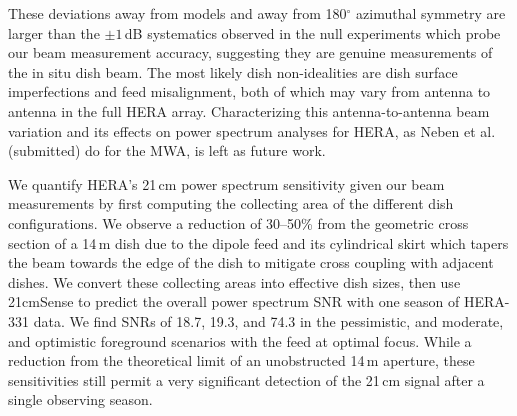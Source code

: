 \documentclass{emulateapj}
\begin{document}
These deviations away from models and away from 180$^\circ$ azimuthal symmetry are larger than the $\pm1$\,dB systematics observed in the null experiments which probe our beam measurement accuracy, suggesting they are genuine measurements of the in situ dish beam. The most likely dish non-idealities are dish surface imperfections and feed misalignment, both of which may vary from antenna to antenna in the full HERA array. Characterizing this antenna-to-antenna beam variation and its effects on power spectrum analyses for HERA, as Neben et al. (submitted) do for the MWA, is left as future work.

We quantify HERA's 21\,cm power spectrum sensitivity given our beam measurements by first computing the collecting area of the different dish configurations. We observe a reduction of 30--50\% from the geometric cross section of a 14\,m dish due to the dipole feed and its cylindrical skirt which tapers the beam towards the edge of the dish to mitigate cross coupling with adjacent dishes. We convert these collecting areas into effective dish sizes, then use 21cmSense to predict the overall power spectrum SNR with one season of HERA-331 data. We find SNRs of 18.7, 19.3, and 74.3 in the pessimistic, and moderate, and optimistic foreground scenarios with the feed at optimal focus. While a reduction from the theoretical limit of an unobstructed 14\,m aperture, these sensitivities still permit a very significant detection of the 21\,cm signal after a single observing season.
\end{document}
